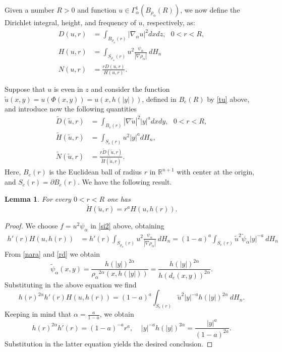 \documentclass[11pt]{amsart}
\theoremstyle{plain}
\newtheorem{lemma}[thrm]{Lemma}
\numberwithin{equation}{section}
\begin{document}
 Given a number $R>0$ and function $u\in \Gamma^1_\alpha(B_{\rho_\alpha}(R))$, we now define the Dirichlet integral, height, and frequency of $u$, respectively, as:
\begin{align}
 D(u,r) & = \int_{B_{\rho_\alpha}(r)}|\nabla_\alpha u|^2 dx dz,\ \ \ 0<r<R, \label{D}\\
 H(u,r) & = \int_{S_{\rho_\alpha}(r)} u^2\frac{\psi_\alpha}{|\nabla {\rho_\alpha}|}\ dH_{n}\\
N(u,r) & = \frac{rD(u,r)}{H(u,r)}.
\end{align}

Suppose that $u$ is even in $z$ and consider the function $\tilde u(x,y) = u(\Phi(x,y)) = u(x,h(|y|))$, defined in $B_e(R)$ by \eqref{tu} above, and introduce now the following quantities
\begin{align}
\tilde D(\tilde u,r) & = \int_{B_e(r)}  |\nabla \tilde u|^2 |y|^a dx dy,\ \ \ 0<r<R,
 \label{tD}\\
\tilde H(\tilde u,r) & = \int_{S_{e}(r)} u^2 |y|^a  dH_{n},
\label{tH}\\
\tilde N(\tilde u,r) &=  \frac{r \tilde D(\tilde u,r)}{\tilde H(\tilde u,r)}.
\label{tN}
\end{align}
Here, $B_e(r)$ is the Euclidean ball of radius $r$ in ${\mathbb R}^{n+1}$ with center at the origin, and $S_e(r)=\partial B_e(r)$.
We have the following result.

\begin{lemma}\label{L:hth}
For every $0<r<R$ one has
\[
\tilde H(\tilde u,r) =  r^a H(u,h(r)).
\]
\end{lemma}

\begin{proof}

We choose $f = u^2 \psi_\alpha$  in \eqref{si2} above, obtaining
\begin{align*}
h'(r) H(u,h(r)) & = h'(r) \int_{S_{\rho_\alpha}(r)} u^2\frac{\psi_\alpha}{|\nabla {\rho_\alpha}|}\ dH_{n}  = (1-a)^a \int_{S_{e}(r)} \tilde u^2 \tilde \psi_\alpha |y|^{-a}\ dH_{n}
\end{align*}
From \eqref{nara} and \eqref{rd} we obtain
\[
\tilde \psi_\alpha(x,y) = \frac{h(|y|)^{2\alpha}}{{\rho_\alpha}^{2\alpha}(x,h(|y|))} =  \frac{h(|y|)^{2\alpha}}{h(d_e(x,y))^{2\alpha}}.
\]
Substituting in the above equation we find
\[
h(r)^{2\alpha} h'(r) H(u,h(r)) =  (1-a)^a \int_{S_{e}(r)} \tilde u^2  |y|^{-a} h(|y|)^{2\alpha}\ dH_{n}.
\]
Keeping in mind that $\alpha = \frac{a}{1-a}$, we obtain
\[
h(r)^{2\alpha} h'(r) = (1-a)^{-a} r^a,\ \ \ \ \ |y|^{-a} h(|y|)^{2\alpha} = \frac{|y|^a}{(1-a)^{2a}}.
 \]
Substitution in the latter equation yields the desired conclusion.

\end{proof}
\end{document}
